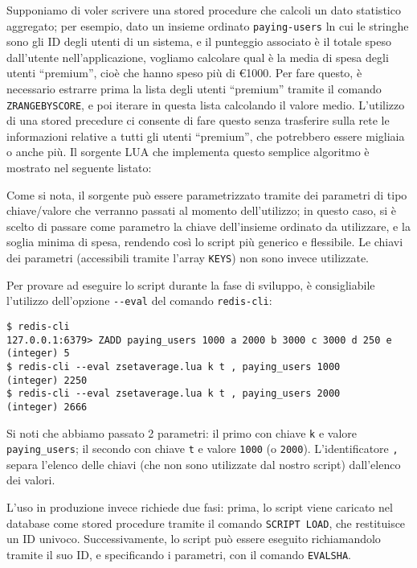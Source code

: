 Supponiamo di voler scrivere una stored procedure che calcoli un dato statistico aggregato; per
esempio, dato un insieme ordinato \verb|paying-users| ln cui le stringhe sono gli ID degli utenti
di un sistema, e il punteggio associato è il totale speso dall'utente nell'applicazione, vogliamo
calcolare qual è la media di spesa degli utenti ``premium'', cioè che hanno speso più di €1000. 
Per fare questo, è necessario estrarre prima la lista degli utenti ``premium'' tramite il comando
\verb|ZRANGEBYSCORE|, e poi iterare in questa lista calcolando il valore medio. L'utilizzo di una
stored precedure ci consente di fare questo senza trasferire sulla rete le informazioni relative
a tutti gli utenti ``premium'', che potrebbero essere migliaia o anche più. Il sorgente LUA che
implementa questo semplice algoritmo è mostrato nel seguente listato:

\medskip


Come si nota, il sorgente può essere parametrizzato tramite dei parametri di tipo chiave/valore
che verranno passati al momento dell'utilizzo; in questo caso, si è scelto di passare come parametro 
la chiave dell'insieme ordinato da utilizzare, e la soglia minima di spesa, rendendo così lo script 
più generico e flessibile. Le chiavi dei parametri (accessibili tramite l'array \verb|KEYS|) non
sono invece utilizzate.

Per provare ad eseguire lo script durante la fase di sviluppo, è consigliabile l'utilizzo
dell'opzione \verb|--eval| del comando \verb|redis-cli|:

\medskip
\begin{lstlisting}
$ redis-cli
127.0.0.1:6379> ZADD paying_users 1000 a 2000 b 3000 c 3000 d 250 e
(integer) 5
$ redis-cli --eval zsetaverage.lua k t , paying_users 1000
(integer) 2250
$ redis-cli --eval zsetaverage.lua k t , paying_users 2000
(integer) 2666
\end{lstlisting}

Si noti che abbiamo passato 2 parametri: il primo con chiave \verb|k| e valore \verb|paying_users|;
il secondo con chiave \verb|t| e valore \verb|1000| (o \verb|2000|). L'identificatore \verb|,|
separa l'elenco delle chiavi (che non sono utilizzate dal nostro script) dall'elenco dei valori.

L'uso in produzione invece richiede due fasi: prima, lo script viene caricato nel database
come stored procedure tramite il comando \verb|SCRIPT LOAD|, che restituisce un ID univoco. 
Successivamente, lo script può essere eseguito richiamandolo tramite il suo ID, e specificando 
i parametri, con il comando \verb|EVALSHA|.

